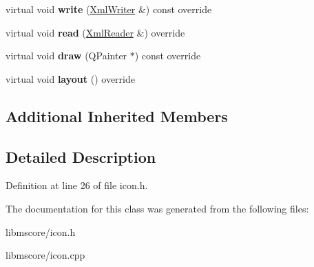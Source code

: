\begin{DoxyCompactItemize}
\mbox{\label{class_ms_1_1_icon_a6b34d5c197710ec84489a2fbc0a2913d}} 
virtual void {\bfseries write} (\hyperlink{class_ms_1_1_xml_writer}{Xml\+Writer} \&) const override
\item 
\mbox{\label{class_ms_1_1_icon_a4731f59b3e4fe5b68ef167d8bec82c48}} 
virtual void {\bfseries read} (\hyperlink{class_ms_1_1_xml_reader}{Xml\+Reader} \&) override
\item 
\mbox{\label{class_ms_1_1_icon_ac0f03e81aa4d4f70744164b2d410afae}} 
virtual void {\bfseries draw} (Q\+Painter $\ast$) const override
\item 
\mbox{\label{class_ms_1_1_icon_a2ca036bd0b8bc95ae23b3451d2762ef7}} 
virtual void {\bfseries layout} () override
\end{DoxyCompactItemize}
\subsection*{Additional Inherited Members}


\subsection{Detailed Description}


Definition at line 26 of file icon.\+h.



The documentation for this class was generated from the following files\+:\begin{DoxyCompactItemize}
\item 
libmscore/icon.\+h\item 
libmscore/icon.\+cpp\end{DoxyCompactItemize}
